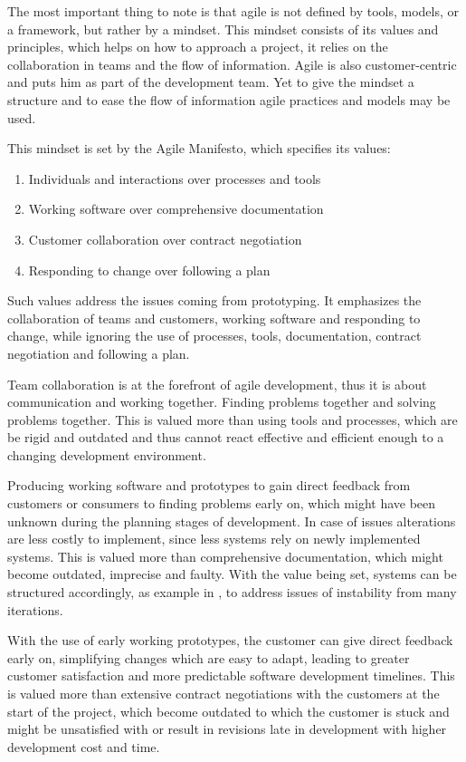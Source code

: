 \documentclass[runningheads]{llncs}
\begin{document}
The most important thing to note is that agile is not defined by tools, models, or a framework, but rather by a mindset\cite{ref_agilemanifesto}. 
This mindset consists  of its values and principles, which helps on how to approach a project, it relies on the collaboration 
in teams and the flow of information. Agile is also customer-centric and puts him as part of the development team. Yet to 
give the mindset a structure and to ease the flow of information agile practices and models may be used.

This mindset is set by the Agile Manifesto\cite{ref_agilemanifesto}, which specifies its values:
\begin{enumerate}
  \item Individuals and interactions over processes and tools
  \item Working software over comprehensive documentation
  \item Customer collaboration over contract negotiation
  \item Responding to change over following a plan 
\end{enumerate}
Such values address the issues coming from prototyping. It emphasizes the collaboration of teams and customers, working software
and responding to change, while ignoring the use of processes, tools, documentation, contract negotiation and following a plan.

Team collaboration is at the forefront of agile development, thus it is about communication and working together. 
Finding problems together and solving problems together. This is valued more than using tools and processes, which are be rigid and outdated
and thus cannot react effective and efficient enough to a changing development environment.

Producing working software and prototypes to gain direct feedback from customers or consumers to finding problems early on,
which might have been unknown during the planning stages of development. In case of issues alterations are less costly to implement, 
since less systems rely on newly implemented systems. This is valued more than comprehensive documentation, which might become outdated, 
imprecise and faulty. With the value being set, systems can be structured accordingly, as example in \cite{ref_health}, to address
issues of instability from many iterations.

With the use of early working prototypes, the customer can give direct feedback early on, simplifying changes which are easy to adapt,
leading to greater customer satisfaction and more predictable software development timelines. This is valued more than extensive 
contract negotiations with the customers at the start of the project, which become outdated to which the customer is stuck and might 
be unsatisfied with or result in revisions late in development with higher development cost and time.
\end{document}
